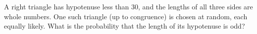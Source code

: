 A right triangle has hypotenuse less than $30$, and the lengths of all three sides are whole numbers. One such triangle (up to congruence) is chosen at random, each equally likely. What is the probability that the length of its hypotenuse is odd?
